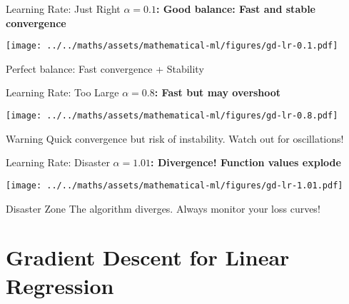 \documentclass[usenames,dvipsnames]{beamer}
\begin{document}
  \begin{frame}{Learning Rate: Just Right}
    \textbf{$\alpha = 0.1$: Good balance: Fast and stable convergence}
    \begin{center}
    \texttt{[image: ../../maths/assets/mathematical-ml/figures/gd-lr-0.1.pdf]}
    \end{center}
    
    \begin{keypointsbox}{}
    Perfect balance: Fast convergence + Stability
    \end{keypointsbox}
  \end{frame}

  \begin{frame}{Learning Rate: Too Large}
    \textbf{$\alpha = 0.8$: Fast but may overshoot}
    \begin{center}
    \texttt{[image: ../../maths/assets/mathematical-ml/figures/gd-lr-0.8.pdf]}
    \end{center}
    
    \begin{alertbox}{Warning}
    Quick convergence but risk of instability. Watch out for oscillations!
    \end{alertbox}
  \end{frame}

  \begin{frame}{Learning Rate: Disaster}
    \textbf{$\alpha = 1.01$: Divergence! Function values explode}
    \begin{center}
    \texttt{[image: ../../maths/assets/mathematical-ml/figures/gd-lr-1.01.pdf]}
    \end{center}
    
    \begin{alertbox}{Disaster Zone}
    The algorithm diverges. Always monitor your loss curves!
    \end{alertbox}
  \end{frame}

  \section{Gradient Descent for Linear Regression}
\end{document}
